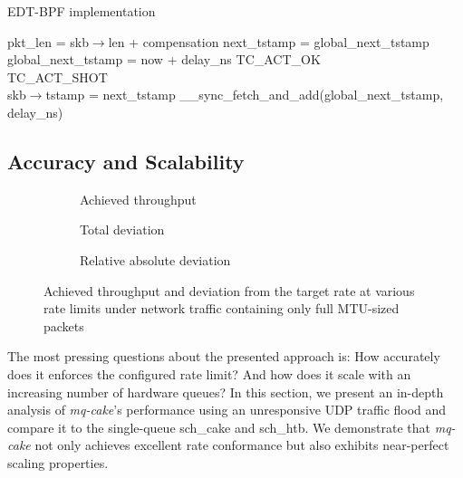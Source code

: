 \begin{algorithm}[t]
    \caption{EDT-BPF implementation}\label{alg:edt-ebpf}
\begin{algorithmic}[1]
    \State pkt\_len = skb$\rightarrow$len + compensation
    \State next\_tstamp = global\_next\_tstamp
    \\
        \State global\_next\_tstamp = now + delay\_ns
        \State \Return TC\_ACT\_OK
    \EndIf
    \\
        \State \Return TC\_ACT\_SHOT
    \EndIf
    \\
    \State skb$\rightarrow$tstamp = next\_tstamp
    \State \_\_sync\_fetch\_and\_add(global\_next\_tstamp, delay\_ns)
\EndProcedure
\end{algorithmic}
\end{algorithm}

\subsection{Accuracy and Scalability}
\begin{figure*}
    \begin{subfigure}{0.3\linewidth}
        \centering
        
        \caption{Achieved throughput}\label{fig:tp_rate_conformance}
    \end{subfigure}
    \hfill
    \hspace{0.5cm}
    \begin{subfigure}{0.3\linewidth}
        \centering
        
        \caption{Total deviation}\label{fig:tp_deviation_total}
    \end{subfigure}
    \hfill
    \begin{subfigure}{0.3\linewidth}
        \centering
        
        \caption{Relative absolute deviation}\label{fig:tp_deviation_perc}
    \end{subfigure}
    \caption{Achieved throughput and deviation from the target rate at various rate limits under
    network traffic containing only full MTU-sized packets}\label{fig:accuracy}
\end{figure*}
The most pressing questions about the presented approach is: How accurately does it enforces the configured rate limit? And how does it scale with an increasing number of hardware queues?
In this section, we present an in-depth analysis of \textit{mq-cake}'s performance using an unresponsive UDP traffic flood and compare it to the single-queue sch\_cake and sch\_htb. 
We demonstrate that \textit{mq-cake} not only achieves excellent rate conformance but also exhibits near-perfect scaling properties.

